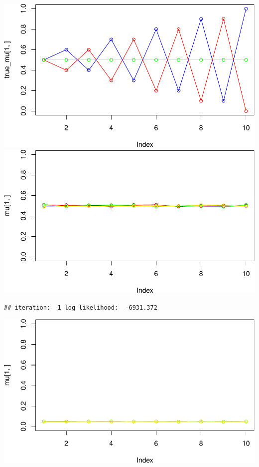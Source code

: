 \documentclass[
]{article}
\begin{document}
\includegraphics{Lab1Block2_files/figure-latex/unnamed-chunk-1-11.pdf}
\includegraphics{Lab1Block2_files/figure-latex/unnamed-chunk-1-12.pdf}

\begin{verbatim}
## iteration:  1 log likelihood:  -6931.372
\end{verbatim}

\includegraphics{Lab1Block2_files/figure-latex/unnamed-chunk-1-13.pdf}
\end{document}
